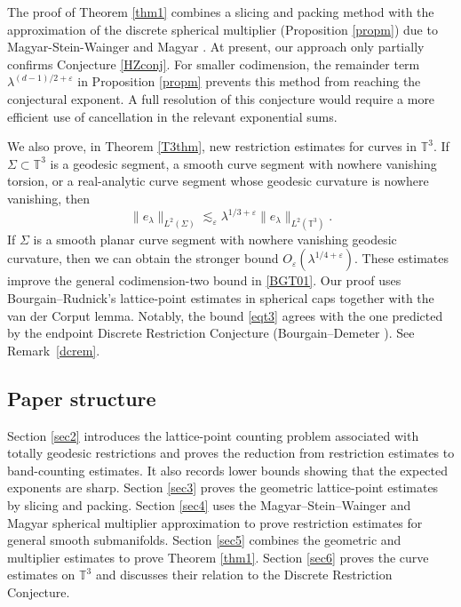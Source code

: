 \documentclass[11pt,reqno]{amsart}
\numberwithin{equation}{section}
\newcommand{\1}{\textbf{1}}
\newcommand{\eps}{\varepsilon}
\newcommand{\la}{\lambda}
\begin{document}
	
	The proof of Theorem \ref{thm1} combines a slicing and packing method with the approximation of the discrete spherical multiplier (Proposition \ref{propm}) due to Magyar-Stein-Wainger \cite{msw} and Magyar \cite{m}. At present, our approach only partially confirms Conjecture \ref{HZconj}. For smaller codimension, the remainder term \(\lambda^{(d-1)/2+\eps}\) in Proposition \ref{propm} prevents
	this method from reaching the conjectural exponent. A full resolution of this conjecture would require a more efficient use of cancellation in the relevant exponential sums. 
	
	We also prove, in Theorem \ref{T3thm}, new restriction estimates for curves in \(\mathbb T^3\).  If
	\(\Sigma\subset\mathbb T^3\) is a geodesic segment, a smooth curve segment
	with nowhere vanishing torsion, or a real-analytic curve segment whose geodesic curvature is nowhere vanishing, then
	\begin{equation}\label{eqt3}
		\|e_\lambda\|_{L^2(\Sigma)}
		\lesssim_\eps
		\lambda^{1/3+\eps}
		\|e_\lambda\|_{L^2(\mathbb T^3)}.
	\end{equation}
	If \(\Sigma\) is a smooth planar curve segment with nowhere vanishing geodesic
	curvature, then we can obtain the stronger bound $O_\eps(\la^{1/4+\eps})$. 
	These estimates improve the general codimension-two bound in \eqref{BGT01}.
	Our proof uses Bourgain--Rudnick's lattice-point estimates in spherical caps
	together with the van der Corput lemma. Notably, the bound \eqref{eqt3} agrees with the one predicted by the endpoint Discrete Restriction Conjecture (Bourgain--Demeter
	\cite[Conjecture~2.6]{BD}). See Remark~\ref{dcrem}.
	
	\subsection{Paper structure}
	
	Section \ref{sec2} introduces the lattice-point counting problem associated with
	totally geodesic restrictions and proves the reduction from restriction
	estimates to band-counting estimates.  It also records lower bounds showing
	that the expected exponents are sharp.  Section \ref{sec3} proves the geometric
	lattice-point estimates by slicing and packing.  Section \ref{sec4} uses the
	Magyar--Stein--Wainger and Magyar spherical multiplier approximation to prove
	restriction estimates for general smooth submanifolds.  Section \ref{sec5} combines the
	geometric and multiplier estimates to prove Theorem \ref{thm1}.  Section \ref{sec6}
	proves the curve estimates on \(\mathbb T^3\) and discusses their relation to
	the Discrete Restriction Conjecture.
	
\end{document}
